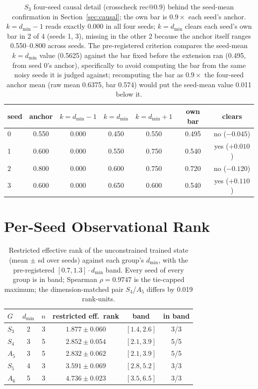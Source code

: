 \documentclass{article}
\makeatletter
\newcommand{\dmin}{d_{\min}}
\newcommand{\recninety}{\mathrm{rec}@0.9}
\makeatother
\begin{document}
\begin{table}[H]
\centering
\small
\begin{tabular}{lcccccc}
\toprule
seed & anchor & $k{=}\dmin{-}1$ & $k{=}\dmin$ & $k{=}\dmin{+}1$ & own bar & clears \\
\midrule
0 & 0.550 & 0.000 & 0.450 & 0.550 & 0.495 & no ($-0.045$) \\
1 & 0.600 & 0.000 & 0.550 & 0.750 & 0.540 & yes ($+0.010$) \\
2 & 0.800 & 0.000 & 0.600 & 0.750 & 0.720 & no ($-0.120$) \\
3 & 0.600 & 0.000 & 0.650 & 0.600 & 0.540 & yes ($+0.110$) \\
\bottomrule
\end{tabular}
\caption{$S_3$ four-seed causal detail (crosscheck $\recninety$) behind
the seed-mean confirmation in Section~\ref{sec:causal}; the own bar is
$0.9 \times$ each seed's anchor. $k = \dmin{-}1$ reads exactly 0.000 in
all four seeds; $k = \dmin$ clears each seed's own bar in 2 of 4 (seeds
1, 3), missing in the other 2 because the anchor itself ranges
0.550--0.800 across seeds. The pre-registered criterion compares the
seed-mean $k = \dmin$ value (0.5625) against the bar fixed before the
extension ran (0.495, from seed 0's anchor), specifically to avoid
computing the bar from the same noisy seeds it is judged against;
recomputing the bar as $0.9\times$ the four-seed anchor mean (raw mean
0.6375, bar 0.574) would put the seed-mean value 0.011 below it.}
\label{tab:s3seeds}
\end{table}

\section{Per-Seed Observational Rank}
\label{app:m1}

\begin{table}[H]
\centering
\small
\begin{tabular}{lccccc}
\toprule
$G$ & $\dmin$ & $n$ & restricted eff.\ rank & band & in band \\
\midrule
$S_3$ & 2 & 3 & $1.877 \pm 0.060$ & $[1.4, 2.6]$ & 3/3 \\
$S_4$ & 3 & 5 & $2.852 \pm 0.054$ & $[2.1, 3.9]$ & 5/5 \\
$A_5$ & 3 & 5 & $2.832 \pm 0.062$ & $[2.1, 3.9]$ & 5/5 \\
$S_5$ & 4 & 3 & $3.591 \pm 0.069$ & $[2.8, 5.2]$ & 3/3 \\
$A_6$ & 5 & 3 & $4.736 \pm 0.023$ & $[3.5, 6.5]$ & 3/3 \\
\bottomrule
\end{tabular}
\caption{Restricted effective rank of the unconstrained trained state
(mean $\pm$ sd over seeds) against each group's $\dmin$, with the
pre-registered $[0.7, 1.3] \cdot \dmin$ band. Every seed of every group
is in band; Spearman $\rho = 0.9747$ is the tie-capped maximum; the
dimension-matched pair $S_4$/$A_5$ differs by 0.019 rank-units.}
\label{tab:m1}
\end{table}
\end{document}
